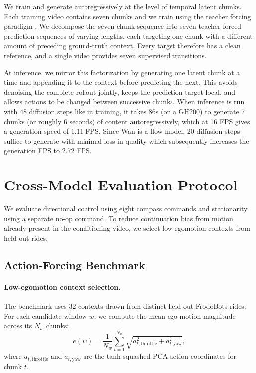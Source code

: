 We train and generate autoregressively at the level of temporal latent chunks.
Each training video contains seven chunks and we train using the teacher forcing paradigm \cite{williams1989learning}. We decompose the seven chunk sequence into seven teacher-forced prediction sequences of varying lengths, each targeting one chunk with a different
amount of preceding ground-truth context. Every target therefore has a clean
reference, and a single video provides seven supervised transitions.

At inference, we mirror this factorization by generating one latent chunk at
a time and appending it to the context before predicting the next. This avoids
denoising the complete rollout jointly, keeps the prediction target local, and
allows actions to be changed between successive chunks. When inference is run with 48 diffusion steps like in training, it takes 86s (on a GH200) to generate 7 chunks (or roughly 6 seconds) of content autoregressively, which at 16 FPS gives a generation speed of 1.11 FPS. Since Wan is a flow model, 20 diffusion steps suffice to generate with minimal loss in quality which subsequently increases the generation FPS to 2.72 FPS.  


\section{Cross-Model Evaluation Protocol}
\label{app:evaluation_protocol}

We evaluate directional control using eight compass commands and stationarity
using a separate no-op command. To reduce continuation bias from motion already
present in the conditioning video, we select low-egomotion contexts from held-out
rides.

\subsection{Action-Forcing Benchmark}
\label{app:action_forcing_details}

\paragraph{Low-egomotion context selection.}
The benchmark uses $32$ contexts drawn from distinct held-out FrodoBots rides.
For each candidate window $w$, we compute the mean ego-motion magnitude across
its $N_w$ chunks:
\[
e(w)
=
\frac{1}{N_w}
\sum_{t=1}^{N_w}
\sqrt{
a_{t,\mathrm{throttle}}^2
+
a_{t,\mathrm{yaw}}^2
},
\]
where $a_{t,\mathrm{throttle}}$ and $a_{t,\mathrm{yaw}}$ are the
tanh-squashed PCA action coordinates for chunk $t$.

